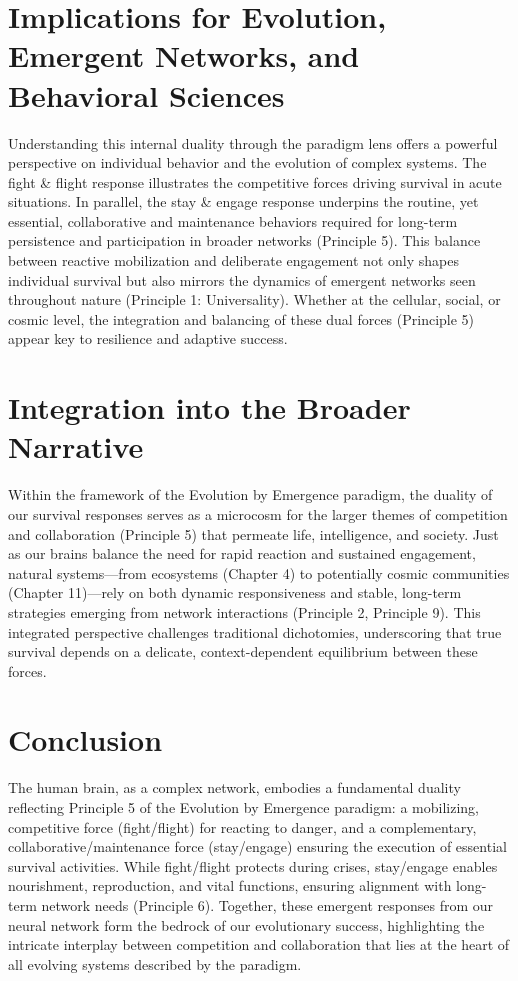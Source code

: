 \documentclass[12pt,openany]{book}
\let\cleardoublepage\clearpage %
\begin{document}
\section{Implications for Evolution, Emergent Networks, and Behavioral Sciences}
Understanding this internal duality through the paradigm lens offers a powerful perspective on individual behavior and the evolution of complex systems. The fight \& flight response illustrates the competitive forces driving survival in acute situations. In parallel, the stay \& engage response underpins the routine, yet essential, collaborative and maintenance behaviors required for long-term persistence and participation in broader networks (Principle 5). This balance between reactive mobilization and deliberate engagement not only shapes individual survival but also mirrors the dynamics of emergent networks seen throughout nature (Principle 1: Universality). Whether at the cellular, social, or cosmic level, the integration and balancing of these dual forces (Principle 5) appear key to resilience and adaptive success. %

\section{Integration into the Broader Narrative}
Within the framework of the Evolution by Emergence paradigm, the duality of our survival responses serves as a microcosm for the larger themes of competition and collaboration (Principle 5) that permeate life, intelligence, and society. Just as our brains balance the need for rapid reaction and sustained engagement, natural systems—from ecosystems (Chapter 4) to potentially cosmic communities (Chapter 11)—rely on both dynamic responsiveness and stable, long-term strategies emerging from network interactions (Principle 2, Principle 9). This integrated perspective challenges traditional dichotomies, underscoring that true survival depends on a delicate, context-dependent equilibrium between these forces. %

\section{Conclusion}
The human brain, as a complex network, embodies a fundamental duality reflecting Principle 5 of the Evolution by Emergence paradigm: a mobilizing, competitive force (fight/flight) for reacting to danger, and a complementary, collaborative/maintenance force (stay/engage) ensuring the execution of essential survival activities. While fight/flight protects during crises, stay/engage enables nourishment, reproduction, and vital functions, ensuring alignment with long-term network needs (Principle 6). Together, these emergent responses from our neural network form the bedrock of our evolutionary success, highlighting the intricate interplay between competition and collaboration that lies at the heart of all evolving systems described by the paradigm. %
\cleardoublepage
\end{document}
